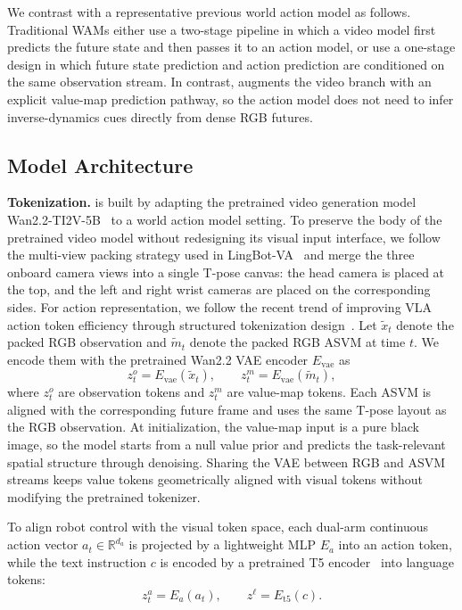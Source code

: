 
\label{sec:method}
We contrast \method with a representative previous world action model as follows. Traditional WAMs either use a two-stage pipeline in which a video model first predicts the future state and then passes it to an action model, or use a one-stage design in which future state prediction and action prediction are conditioned on the same observation stream. In contrast, \method augments the video branch with an explicit value-map prediction pathway, so the action model does not need to infer inverse-dynamics cues directly from dense RGB futures.

\subsection{Model Architecture}
\noindent\textbf{Tokenization.} \method is built by adapting the pretrained video generation model Wan2.2-TI2V-5B~\cite{wan2025wan} to a world action model setting. To preserve the body of the pretrained video model without redesigning its visual input interface, we follow the multi-view packing strategy used in LingBot-VA~\cite{li2026causal} and merge the three onboard camera views into a single T-pose canvas: the head camera is placed at the top, and the left and right wrist cameras are placed on the corresponding sides. For action representation, we follow the recent trend of improving VLA action token efficiency through structured tokenization design~\cite{pertsch2025fast}. Let $\tilde{x}_t$ denote the packed RGB observation and $\tilde{m}_t$ denote the packed RGB ASVM at time $t$. We encode them with the pretrained Wan2.2 VAE encoder $E_{\mathrm{vae}}$ as
\begin{equation}
z_t^{o} = E_{\mathrm{vae}}(\tilde{x}_t), \qquad
z_t^{m} = E_{\mathrm{vae}}(\tilde{m}_t),
\end{equation}
where $z_t^{o}$ are observation tokens and $z_t^{m}$ are value-map tokens. Each ASVM is aligned with the corresponding future frame and uses the same T-pose layout as the RGB observation. At initialization, the value-map input is a pure black image, so the model starts from a null value prior and predicts the task-relevant spatial structure through denoising. Sharing the VAE between RGB and ASVM streams keeps value tokens geometrically aligned with visual tokens without modifying the pretrained tokenizer.

To align robot control with the visual token space, each dual-arm continuous action vector $a_t \in \mathbb{R}^{d_a}$ is projected by a lightweight MLP $E_a$ into an action token, while the text instruction $c$ is encoded by a pretrained T5 encoder~\cite{raffel2020t5} into language tokens:
\begin{equation}
z_t^{a} = E_a(a_t), \qquad z^{\ell} = E_{\mathrm{t5}}(c).
\end{equation}

